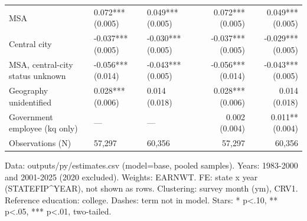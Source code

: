 \begin{table}[!t]
\begin{tabular*}{\linewidth}{@{\extracolsep{\fill}}l|llrr}
MSA & 0.072*** (0.005) & 0.049*** (0.005) & 0.072*** (0.005) & 0.049*** (0.005) \\
Central city & -0.037*** (0.005) & -0.030*** (0.005) & -0.037*** (0.005) & -0.029*** (0.005) \\
MSA, central-city status unknown & -0.056*** (0.014) & -0.043*** (0.005) & -0.056*** (0.014) & -0.043*** (0.005) \\
Geography unidentified & 0.028*** (0.006) & 0.014 (0.018) & 0.028*** (0.006) & 0.014 (0.018) \\
Government employee (kq only) & — & — & 0.002 (0.004) & 0.011** (0.004) \\
Observations (N) & 57,297 & 60,356 & 57,297 & 60,356 \\
\bottomrule
\end{tabular*}
\begin{minipage}{\linewidth}
Data: outputs/py/estimates.csv (model=base, pooled samples). Years: 1983-2000 and 2001-2025 (2020 excluded). Weights: EARNWT. FE: state x year (STATEFIP\textasciicircum{}YEAR), not shown as rows. Clustering: survey month (ym), CRV1. Reference education: college. Dashes: term not in model. Stars: * p<.10, ** p<.05, *** p<.01, two-tailed.\\
\end{minipage}
\end{table}
